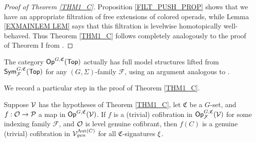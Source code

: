 \documentclass[a4paper,10pt
,draft
]{article}%
\renewcommand{\F}{\mathcal F}
\renewcommand{\1}{\eta}%
\begin{document}
\begin{proof}[Proof of Theorem \ref{THM1_C}]
      Proposition \ref{FILT_PUSH_PROP} shows that we have an appropriate filtration of free extensions of colored operads,
      while Lemma \ref{EXMAINLEM LEM} says that this filtration is levelwise homotopically well-behaved.
      Thus Theorem \ref{THM1_C} follows completely analogously to the proof of Theorem I from \cite{BP_geo}.
\end{proof}



\begin{remark}
      \label{TOP_FULL_REM}
      The category $\mathsf{Op}^{G,\mathfrak C}(\mathsf{Top})$ actually has full model structures lifted from $\Sym^{G, \mathfrak C}_\F(\Top)$
      for any $(G, \Sigma)$-family $\F$,
      using an argument analogous to \cite[Thm. 3.1]{GW}.
\end{remark}

We record a particular step in the proof of Theorem \ref{THM1_C}.
\begin{corollary}
      \label{LGC_COR}
      Suppose $\mathcal V$ has the hypotheses of Theorem \ref{THM1_C},
      let $\mathfrak C$ be a $G$-set, and $f: \mathcal{O} \to \mathcal{P}$ a map in $\mathsf{Op}^{G,\mathfrak C}(\mathcal V)$.
      If $f$ is a (trivial) cofibration in $\Op^{G, \mathfrak C}_\F(\V)$ for some indexing family $\F$,
      and $\mathcal{O}$ is level genuine cofibrant, then
      $f(C)$ is a genuine (trivial) cofibration in $\mathcal V^{\operatorname{Aut}(C)}_{gen}$ for all $\mathfrak C$-signatures $\xi$.
\end{corollary}
      
\end{document}

